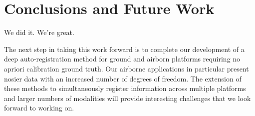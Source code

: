 \documentclass{article}
\begin{document}

\section{Conclusions and Future Work} %
\label{sec:conclusions_and_future_work}
We did it. We're great.

The next step in taking this work forward is to complete our development of a deep auto-registration method for ground and airborn platforms requiring no apriori calibration ground truth.  Our airborne applications in particular present nosier data with an increased number of degrees of freedom. The extension of these methods to simultaneously register information across multiple platforms and larger numbers of modalities will provide interesting challenges that we look forward to working on. 






\end{document}
